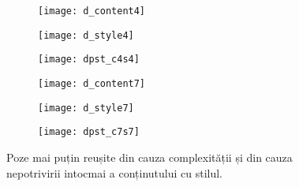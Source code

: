 \begin{figure}[h]
	\centering
    \begin{subfigure}[b]{0.3\textwidth}
		\centering
        \texttt{[image: d\_content4]}
        \label{fig:dpst_d_content4}
	\end{subfigure}
    \hfill
    \begin{subfigure}[b]{0.3\textwidth}
		\centering
        \texttt{[image: d\_style4]}
        \label{fig:dpst_d_style4}
	\end{subfigure}
    \hfill
    \begin{subfigure}[b]{0.3\textwidth}
		\centering
        \texttt{[image: dpst\_c4s4]}
        \label{fig:dpst_c4s4}
	\end{subfigure}
    \begin{subfigure}[b]{0.3\textwidth}
		\centering
        \texttt{[image: d\_content7]}
        \label{fig:dpst_d_content7}
	\end{subfigure}
    \hfill
    \begin{subfigure}[b]{0.3\textwidth}
		\centering
        \texttt{[image: d\_style7]}
        \label{fig:dpst_d_style7}
	\end{subfigure}
    \hfill
    \begin{subfigure}[b]{0.3\textwidth}
		\centering
        \texttt{[image: dpst\_c7s7]}
        \label{fig:dpst_c7s7}
	\end{subfigure}
    \caption{Poze mai puțin reușite din cauza complexității și din cauza nepotrivirii intocmai a conținutului cu stilul.}
\end{figure}

